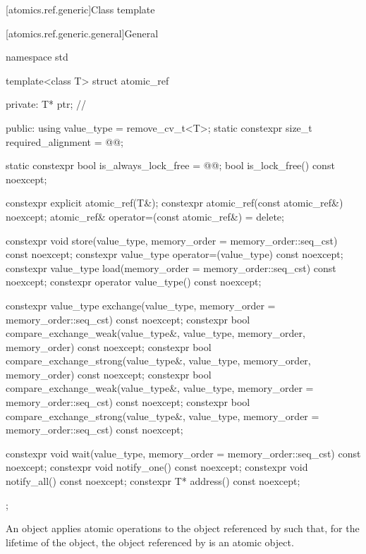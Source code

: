 [atomics.ref.generic]{Class template }

[atomics.ref.generic.general]{General}

%
%
\begin{codeblock}
namespace std {
  template<class T> struct atomic_ref {
  private:
    T* ptr;             // \expos

  public:
    using value_type = remove_cv_t<T>;
    static constexpr size_t required_alignment = @@;

    static constexpr bool is_always_lock_free = @@;
    bool is_lock_free() const noexcept;

    constexpr explicit atomic_ref(T&);
    constexpr atomic_ref(const atomic_ref&) noexcept;
    atomic_ref& operator=(const atomic_ref&) = delete;

    constexpr void store(value_type, memory_order = memory_order::seq_cst) const noexcept;
    constexpr value_type operator=(value_type) const noexcept;
    constexpr value_type load(memory_order = memory_order::seq_cst) const noexcept;
    constexpr operator value_type() const noexcept;

    constexpr value_type exchange(value_type,
                                  memory_order = memory_order::seq_cst) const noexcept;
    constexpr bool compare_exchange_weak(value_type&, value_type,
                                         memory_order, memory_order) const noexcept;
    constexpr bool compare_exchange_strong(value_type&, value_type,
                                           memory_order, memory_order) const noexcept;
    constexpr bool compare_exchange_weak(value_type&, value_type,
                                         memory_order = memory_order::seq_cst) const noexcept;
    constexpr bool compare_exchange_strong(value_type&, value_type,
                                           memory_order = memory_order::seq_cst) const noexcept;

    constexpr void wait(value_type, memory_order = memory_order::seq_cst) const noexcept;
    constexpr void notify_one() const noexcept;
    constexpr void notify_all() const noexcept;
    constexpr T* address() const noexcept;
  };
}
\end{codeblock}

\pnum
An  object applies atomic operations to
the object referenced by  such that,
for the lifetime of the  object,
the object referenced by  is an atomic object.

